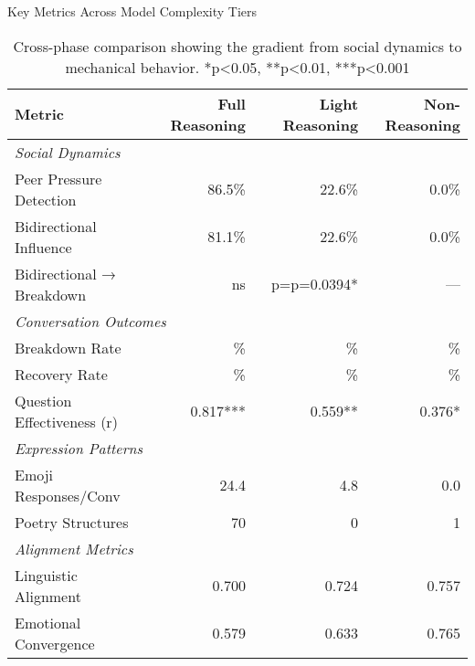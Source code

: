 \documentclass[11pt,letterpaper]{article}
\newcommand{\exponedataTotalSessionsRaw}{37}
\newcommand{\exponedataBreakdownSessionsRaw}{16}
\newcommand{\exponedataRecoverySessionsRaw}{9}
\newcommand{\exponedataBreakdownPercentage}{%
  \fpeval{round(\exponedataBreakdownSessionsRaw / \exponedataTotalSessionsRaw * 100, 1)}\%
}
\newcommand{\exponedataRecoveryPercentage}{%
  \fpeval{round(\exponedataRecoverySessionsRaw / \exponedataTotalSessionsRaw * 100, 1)}\%
}
\newcommand{\exponedataPeerPressurePercentage}{86.5\%}
\newcommand{\exponedataBidirectionalPercentage}{81.1\%}
\newcommand{\exponedataQuestionCorrelation}{0.817}
\newcommand{\exponedataPoetryStructures}{70}
\newcommand{\exponedataAvgEmojiPerConv}{24.4}
\newcommand{\exponedataAverageLinguisticAlignment}{0.700}
\newcommand{\exponedataAverageEmotionalConvergence}{0.579}
\newcommand{\exptwoTotalSessionsRaw}{31}
\newcommand{\exptwoBreakdownSessionsRaw}{10}
\newcommand{\exptwoRecoverySessionsRaw}{0}
\newcommand{\exptwoBreakdownPercentage}{%
  \fpeval{round(\exptwoBreakdownSessionsRaw / \exptwoTotalSessionsRaw * 100, 1)}\%
}
\newcommand{\exptwoRecoveryPercentage}{%
  \fpeval{round(\exptwoRecoverySessionsRaw / \exptwoTotalSessionsRaw * 100, 1)}\%
}
\newcommand{\exptwoPeerPressurePercentage}{22.6\%}
\newcommand{\exptwoBidirectionalPercentage}{22.6\%}
\newcommand{\exptwoQuestionCorrelation}{0.559}
\newcommand{\exptwoBidirectionalPValue}{p=0.0394}
\newcommand{\exptwoPoetryStructures}{0}
\newcommand{\exptwoAvgEmojiPerConv}{4.8}
\newcommand{\exptwoAverageLinguisticAlignment}{0.724}
\newcommand{\exptwoAverageEmotionalConvergence}{0.633}
\newcommand{\expthreeTotalSessionsRaw}{30}
\newcommand{\expthreeBreakdownSessionsRaw}{7}
\newcommand{\expthreeRecoverySessionsRaw}{1}
\newcommand{\expthreeBreakdownPercentage}{%
  \fpeval{round(\expthreeBreakdownSessionsRaw / \expthreeTotalSessionsRaw * 100, 1)}\%
}
\newcommand{\expthreeRecoveryPercentage}{%
  \fpeval{round(\expthreeRecoverySessionsRaw / \expthreeTotalSessionsRaw * 100, 1)}\%
}
\newcommand{\expthreePeerPressurePercentage}{0.0\%}
\newcommand{\expthreeBidirectionalPercentage}{0.0\%}
\newcommand{\expthreeQuestionCorrelation}{0.376}
\newcommand{\expthreePoetryStructures}{1}
\newcommand{\expthreeAvgEmojiPerConv}{0.0}
\newcommand{\expthreeAverageLinguisticAlignment}{0.757}
\newcommand{\expthreeAverageEmotionalConvergence}{0.765}
\begin{document}
\begin{table}[h]
\centering
\caption{Key Metrics Across Model Complexity Tiers}
\begin{tabular}{lrrr}
\toprule
\textbf{Metric} & \textbf{Full Reasoning} & \textbf{Light Reasoning} & \textbf{Non-Reasoning} \\
\midrule
\multicolumn{4}{l}{\textit{Social Dynamics}} \\
Peer Pressure Detection & \exponedataPeerPressurePercentage{} & \exptwoPeerPressurePercentage{} & \expthreePeerPressurePercentage{} \\
Bidirectional Influence & \exponedataBidirectionalPercentage{} & \exptwoBidirectionalPercentage{} & \expthreeBidirectionalPercentage{} \\
Bidirectional → Breakdown & ns & p=\exptwoBidirectionalPValue{}* & — \\
\midrule
\multicolumn{4}{l}{\textit{Conversation Outcomes}} \\
Breakdown Rate & \exponedataBreakdownPercentage{} & \exptwoBreakdownPercentage{} & \expthreeBreakdownPercentage{} \\
Recovery Rate & \exponedataRecoveryPercentage{} & \exptwoRecoveryPercentage{} & \expthreeRecoveryPercentage{} \\
Question Effectiveness (r) & \exponedataQuestionCorrelation{}*** & \exptwoQuestionCorrelation{}** & \expthreeQuestionCorrelation{}* \\
\midrule
\multicolumn{4}{l}{\textit{Expression Patterns}} \\
Emoji Responses/Conv & \exponedataAvgEmojiPerConv{} & \exptwoAvgEmojiPerConv{} & \expthreeAvgEmojiPerConv{} \\
Poetry Structures & \exponedataPoetryStructures{} & \exptwoPoetryStructures{} & \expthreePoetryStructures{} \\
\midrule
\multicolumn{4}{l}{\textit{Alignment Metrics}} \\
Linguistic Alignment & \exponedataAverageLinguisticAlignment{} & \exptwoAverageLinguisticAlignment{} & \expthreeAverageLinguisticAlignment{} \\
Emotional Convergence & \exponedataAverageEmotionalConvergence{} & \exptwoAverageEmotionalConvergence{} & \expthreeAverageEmotionalConvergence{} \\
\bottomrule
\end{tabular}
\caption{Cross-phase comparison showing the gradient from social dynamics to mechanical behavior. *p<0.05, **p<0.01, ***p<0.001}
\label{tab:cross_phase_comparison}
\end{table}
\end{document}
